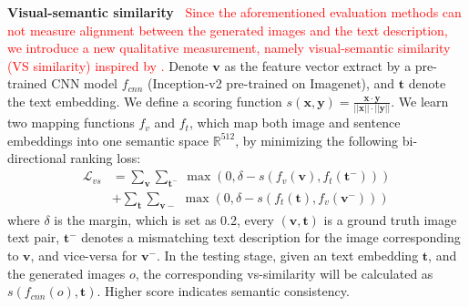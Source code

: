 \documentclass[10pt,twocolumn,letterpaper]{article}
\begin{document}
\textbf{Visual-semantic similarity~}
\textcolor{red}{Since the aforementioned evaluation methods can not measure alignment between the generated images and the text description, we introduce a new qualitative measurement, namely visual-semantic similarity (VS similarity) inspired by \cite{vsemb}.} Denote $\bm{v}$ as the feature vector extract by a pre-trained CNN model $f_{cnn}$ (Inception-v2 \cite{inception} pre-trained on Imagenet), and $\bm{t}$ denote the text embedding. 
We define a scoring function $s(\bm{x}, \bm{y})=\frac{\bm{x}\cdot \bm{y}}{||\bm{x}||\cdot ||\bm{y}||}$. 
We learn two mapping functions $f_v$ and $f_t$, which map both image and sentence embeddings into one semantic space $\mathbb{R}^{512}$, by minimizing the following bi-directional ranking loss:
\begin{equation}
\begin{split}
\mathcal{L}_{vs} &= \sum_{ \bm{v} }\sum_{ \bm{t^-} }~\max( 0, \delta- s(f_v(\bm{v}), f_t( \bm{t^-} ))) \\
&+ \sum_{ \bm{t} }\sum_{ \bm{v-} }~\max( 0,  \delta- s(f_t(\bm{t}), f_v( \bm{v^-} )))
\end{split}
\end{equation}
where $\delta$ is the margin, which is set as 0.2, every $(\bm{v}, \bm{t})$ is a ground truth image text pair, $\bm{t^-}$ denotes a mismatching text description for the image corresponding to $\bm{v}$, and vice-versa for $\bm{v^-}$. In the testing stage, given an text embedding $\bm{t}$, and the generated images $o$, the corresponding vs-similarity will be calculated as $s(f_{cnn}(o), \bm{t})$. Higher score indicates semantic consistency.
\end{document}
